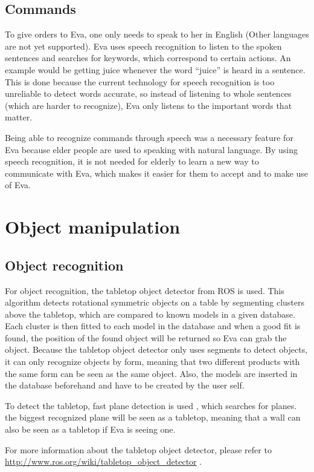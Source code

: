\documentclass[project_eva.tex]{subfiles}
\begin{document}
\subsection*{Commands}
To give orders to Eva, one only needs to speak to her in English (Other languages are not yet supported). Eva uses speech 
recognition to listen to the spoken sentences and searches for keywords, which correspond to certain actions. An example 
would be getting juice whenever the word ``juice'' is heard in a sentence. This is done because the current technology for 
speech recognition is too unreliable to detect words accurate, so instead of listening to whole sentences (which are harder 
to recognize), Eva only listens to the important words that matter.

Being able to recognize commands through speech was a necessary feature for Eva because elder people are used to speaking 
with natural language. By using speech recognition, it is not needed for elderly to learn a new way to communicate with 
Eva, which makes it easier for them to accept and to make use of Eva.

\section*{Object manipulation}
\subsection*{Object recognition}
For object recognition, the tabletop object detector from ROS is used. This algorithm detects rotational symmetric objects on a table by segmenting clusters above the tabletop, which are compared to known models in a given database. Each cluster is then fitted to each model in the database and when a good fit is found, the position of the found object will be returned so Eva can grab the object. Because the tabletop object detector only uses segments to detect objects, it can only recognize objects by form, meaning that two different products with the same form can be seen as the same object. Also, the models are inserted in the database beforehand and have to be created by the user self.

To detect the tabletop, fast plane detection is used \cite{plane}, which 
searches for planes. the biggest recognized plane will be seen as a tabletop, meaning that a wall can also be seen as a 
tabletop if Eva is seeing one.

For more information about the tabletop object detector, please refer to \url{http://www.ros.org/wiki/tabletop\_object\_detector} \cite{tabletop}.
\end{document}
